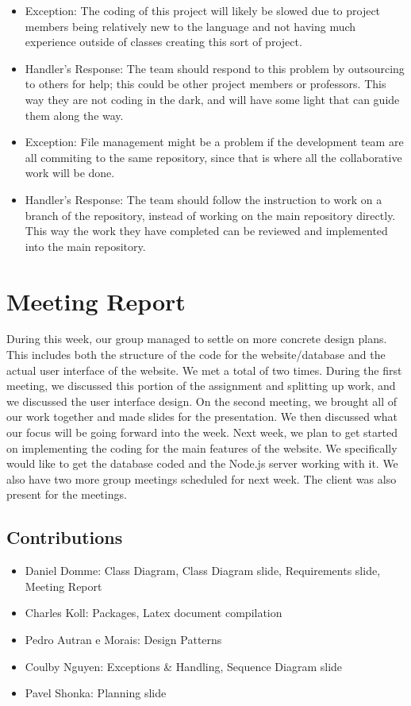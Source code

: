 \documentclass[12pt]{article}
\begin{document}
\quad

\begin{itemize}
\item
	Exception: The coding of this project will likely be slowed due to project members
	being relatively new to the language and not having much experience outside of
	classes creating this sort of project.
\item
	Handler's Response: The team should respond to this problem by outsourcing to
	others for help; this could be other project members or professors. This way they
	are not coding in the dark, and will have some light that can guide them along the
	way.
\end{itemize}

\quad

\begin{itemize}
\item
	Exception: File management might be a problem if the development team are all
	commiting to the same repository, since that is where all the collaborative work
	will be done.
\item
	Handler's Response: The team should follow the instruction to work on a branch of
	the repository, instead of working on the main repository directly. This way the
	work they have completed can be reviewed and implemented into the main repository.
\end{itemize}
\section{Meeting Report}
During this week, our group managed to settle on more concrete design plans. This includes
both the structure of the code for the website/database and the actual user interface of
the website. We met a total of two times. During the first meeting, we discussed this
portion of the assignment and splitting up work, and we discussed the user interface
design. On the second meeting, we brought all of our work together and made slides for the
presentation. We then discussed what our focus will be going forward into the week. Next
week, we plan to get started on implementing the coding for the main features of the
website. We specifically would like to get the database coded and the Node.js server
working with it. We also have two more group meetings scheduled for next week. The client
was also present for the meetings.

\quad

\subsection{Contributions}
\begin{itemize}
\item
	Daniel Domme: Class Diagram, Class Diagram slide, Requirements slide, Meeting Report
\item
	Charles Koll: Packages, Latex document compilation
\item
	Pedro Autran e Morais: Design Patterns
\item
	Coulby Nguyen: Exceptions \& Handling, Sequence Diagram slide
\item
	Pavel Shonka: Planning slide
\end{itemize}
\end{document}

